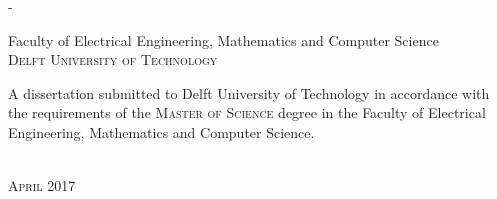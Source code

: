 \begin{titlingpage}
\begin{SingleSpace}
\begin{adjustwidth*}{\unitlength}{-\unitlength}
\begin{center}
\vspace{6mm}
{\large Faculty of Electrical Engineering, Mathematics and Computer Science\\
\textsc{Delft University of Technology}}\\
\vspace{11mm}
\begin{minipage}{10cm}
A dissertation submitted to Delft University of Technology in accordance with the requirements of the \textsc{Master of Science} degree in the Faculty of Electrical Engineering, Mathematics and Computer Science.
\end{minipage}\\
\vspace{9mm}
{\large\textsc{April 2017}}
\vspace{12mm}
\end{center}
\begin{flushright}
\end{flushright}
\end{adjustwidth*}
\end{SingleSpace}
\end{titlingpage}